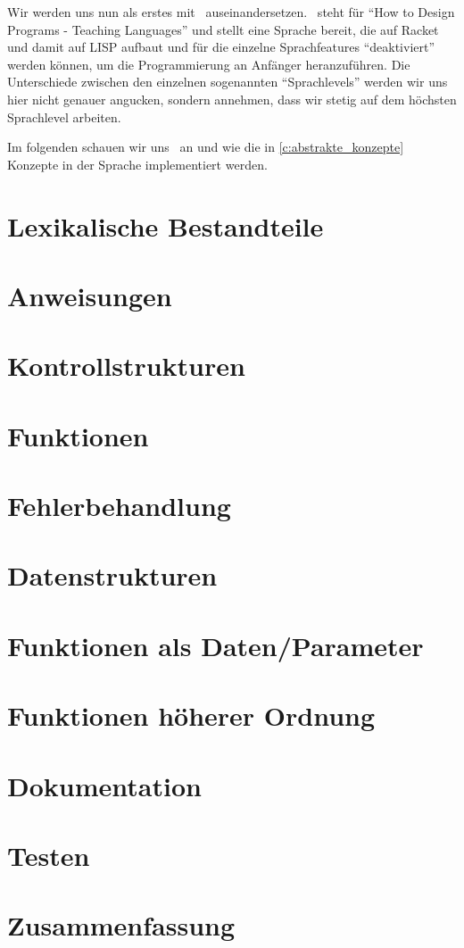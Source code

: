Wir werden uns nun als erstes mit \racket\, auseinandersetzen. \racket\, steht für \enquote{How to Design Programs - Teaching Languages} und stellt eine Sprache bereit, die auf Racket und damit auf LISP aufbaut und für die einzelne Sprachfeatures \enquote{deaktiviert} werden können, um die Programmierung an Anfänger heranzuführen. Die Unterschiede zwischen den einzelnen sogenannten \enquote{Sprachlevels} werden wir uns hier nicht genauer angucken, sondern annehmen, dass wir stetig auf dem höchsten Sprachlevel arbeiten.

Im folgenden schauen wir uns \racket\, an und wie die in \ref{c:abstrakte_konzepte} Konzepte in der Sprache implementiert werden.

\section{Lexikalische Bestandteile}
	

\section{Anweisungen}
	

\section{Kontrollstrukturen}
	

\section{Funktionen}
	

\section{Fehlerbehandlung}
	

\section{Datenstrukturen}
	

\section{Funktionen als Daten/Parameter}
	

\section{Funktionen höherer Ordnung}
	

\section{Dokumentation}
	

\section{Testen}
	

\section{Zusammenfassung}
	
